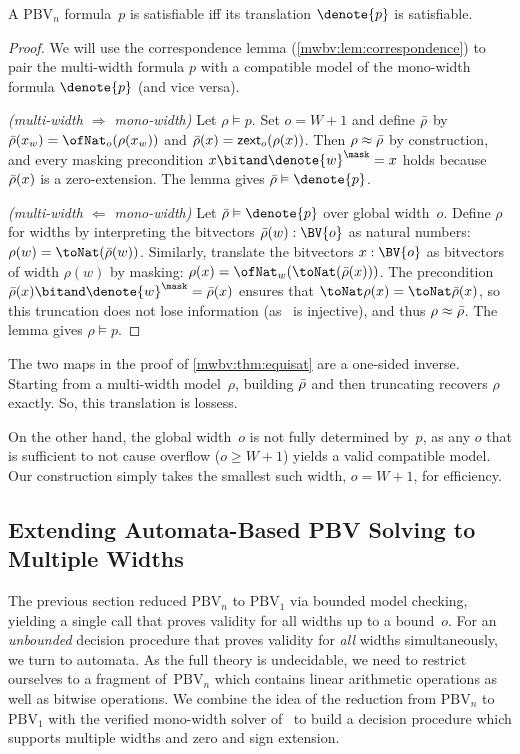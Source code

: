 \begin{theorem}[Equisatisfiability]\label{mwbv:thm:equisat}
A $\text{PBV}_n$ formula~$p$ is satisfiable iff its translation $\denote{p}$ is satisfiable.
\end{theorem}
\begin{proof}
We will use the correspondence lemma (\cref{mwbv:lem:correspondence})
to pair the multi-width formula $p$ with a compatible model of the mono-width formula $\denote{p}$ (and vice versa).

\emph{(multi-width $\Rightarrow$ mono-width)} Let $\rho \vDash p$. Set $o = W + 1$ and define $\bar{\rho}$ by
$\rhob(x_w) = \ofNat_o(\rho(x_w))$ and $\bar{\rho}(x) = \mathsf{zext}_o(\rho(x))$.
Then $\rho \approx \bar{\rho}$ by construction, and every masking precondition
$x \bitand \denote{w}^\mask = x$ holds because $\bar{\rho}(x)$ is a zero-extension.
The lemma gives $\rhob \vDash \denote{p}$.

\emph{(multi-width $\Leftarrow$ mono-width)} Let $\rhob \vDash \denote{p}$ over global width~$o$. Define
$\rho$ for widths by interpreting the bitvectors $\rhob(w) : \BV{o}$ as natural numbers: $\rho(w) = \toNat(\rhob(w))$.
Similarly, translate the bitvectors $x : \BV{o}$ as bitvectors of width
$\rho(w)$ by masking: $\rho(x) = \ofNat_w (\toNat (\rhob(x)))$.
The precondition $\rhob(x) \bitand \denote{w}^\mask = \rhob(x)$ ensures that $\toNat \rho(x) = \toNat \rhob(x)$, so
this truncation does not lose information (as \toNat~is injective), and thus $\rho \approx \bar{\rho}$. The lemma gives $\rho \vDash p$.
\end{proof}

\begin{remark}\label{mwbv:rem:width-choice}
The two maps in the proof of \cref{mwbv:thm:equisat} are a one-sided inverse.
Starting from a multi-width model~$\rho$, building $\bar{\rho}$ and then truncating recovers $\rho$ exactly.
So, this translation is lossess.

On the other hand, the global width~$o$ is not fully determined by~$p$, as any $o$
that is sufficient to not cause overflow ($o \ge W + 1$) yields a valid compatible model.
Our construction simply takes the smallest such width, $o = W + 1$, for efficiency.
\end{remark}


\subsection{Extending Automata-Based PBV Solving to Multiple Widths}
\label{sec:mwbv:automata}
The previous section reduced $\text{PBV}_n$ to $\text{PBV}_1$ via bounded model
checking, yielding a single \qfbv{} call that proves validity for all widths up
to a bound~$o$.
%
For an \emph{unbounded} decision procedure that proves validity for
\emph{all} widths simultaneously, we turn to automata.
%
As the full theory is undecidable, we need to restrict ourselves to a fragment
of~$\text{PBV}_n$ which contains linear arithmetic operations as well as bitwise
operations.
%
We combine the idea of the reduction from $\text{PBV}_n$ to $\text{PBV}_1$ with
the verified mono-width solver of~\citet{bhat2025certified} to build a decision
procedure which supports multiple widths and zero and sign extension.


